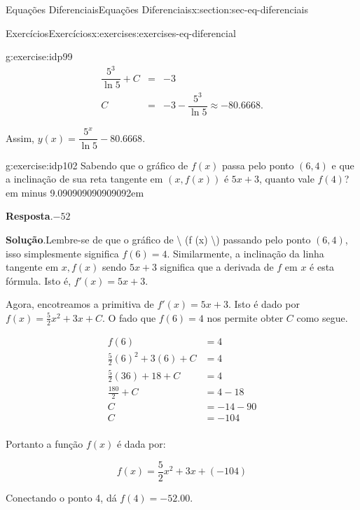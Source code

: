 \documentclass[oneside,10pt,]{article}
\newcommand{\blocktitlefont}{\relax}
\newcommand{\fillin}[1]{\leavevmode\leaders\vrule height -1.2pt depth 1.5pt \hskip #1em minus #1em \null}
\numberwithin{equation}{section}
\newcommand{\amp}{&}
\begin{document}
\begin{sectionptx}{Equações Diferenciais}{}{Equações Diferenciais}{}{}{x:section:sec-eq-diferenciais}
\begin{exercises-subsection}{Exercícios}{}{Exercícios}{}{}{x:exercises:exercises-eq-diferencial}
\begin{exercisegroup}
\begin{divisionexerciseeg}{1}{}{}{g:exercise:idp99}
\begin{equation*}
\begin{array}{rcl}
\dfrac{5^{3}}{\ln 5} + C \amp =\amp  -3 \\
C \amp =\amp  -3 - \dfrac{5^{3}}{\ln 5} \approx -80.6668.
\end{array}
\end{equation*}
%
\par
Assim, \(y(x) = \dfrac{5^x}{\ln 5}  - 80.6668\).%
\end{divisionexerciseeg}%
\begin{divisionexerciseeg}{2}{}{}{g:exercise:idp102}%
Sabendo que o gráfico de  \(f(x)\) passa pelo ponto \(( 6, 4 )\)	e que a inclinação de sua reta tangente em \((x,f(x))\) é \(5 x + 3\), quanto vale  \(f(  4 )\)? \fillin{9.090909090909092}%
\par\smallskip%
\noindent\textbf{\blocktitlefont Resposta}.\hypertarget{g:answer:idp103}{}\quad{}\(-52\)%
\par\smallskip%
\noindent\textbf{\blocktitlefont Solução}.\hypertarget{g:solution:idp104}{}\quad{}Lembre-se de que o gráfico de \textbackslash{} (f (x) \textbackslash{}) passando pelo ponto \((6, 4)\), isso simplesmente significa \(f(6) = 4\).  Similarmente, a inclinação da linha tangente em \(x, f(x)\) sendo \({5}x + 3\) significa que a derivada de \(f\) em \(x\) é esta fórmula. Isto é, \(f'(x) = {5}x + 3\).%
\par
Agora, encotreamos a primitiva de \(f'(x) = {5}x + 3\).  Isto é dado por \(f(x) = \frac{5}{2}x^2 + {3}x + C\).  O fado que \(f(6) = 4\) nos permite obter \(C\) como segue.%
\par
%
\begin{equation*}
\begin{aligned}
f(6) \amp  = 4 \\
\frac{5}{2}(6)^2 + {3}(6) + C \amp  = 4 \\
\frac{5}{2}(36) + 18 + C \amp  = 4 \\
\frac{180}{2} + C \amp  = 4 - 18 \\
C \amp  = -14-90 \\
C \amp  = -104 \\
\end{aligned}
\end{equation*}
%
\par
Portanto a função \(f(x)\) é dada por:%
\par
%
\begin{equation*}
f(x) = \frac{5}{2}x^2 + {3}x + (-104)
\end{equation*}
%
\par
Conectando o ponto 4, dá \(f(4) = -52.00\).%
\end{divisionexerciseeg}%

\end{exercisegroup}
\end{exercises-subsection}
\end{sectionptx}
\end{document}

